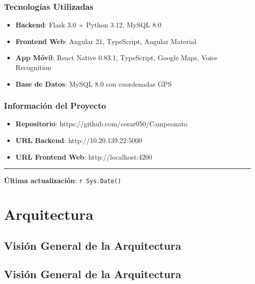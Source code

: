 \documentclass[
  spanish,
  11pt,
  letterpaper,
]{book}
\providecommand{\tightlist}{%
  \setlength{\itemsep}{0pt}\setlength{\parskip}{0pt}}
\begin{document}
\section{Tecnologías Utilizadas}\label{tecnologuxedas-utilizadas}

\begin{itemize}
\tightlist
\item
  \textbf{Backend}: Flask 3.0 + Python 3.12, MySQL 8.0
\item
  \textbf{Frontend Web}: Angular 21, TypeScript, Angular Material
\item
  \textbf{App Móvil}: React Native 0.83.1, TypeScript, Google Maps,
  Voice Recognition
\item
  \textbf{Base de Datos}: MySQL 8.0 con coordenadas GPS
\end{itemize}

\section{Información del Proyecto}\label{informaciuxf3n-del-proyecto}

\begin{itemize}
\tightlist
\item
  \textbf{Repositorio}: https://github.com/cesar050/Campeonato
\item
  \textbf{URL Backend}: http://10.20.139.22:5000
\item
  \textbf{URL Frontend Web}: http://localhost:4200
\end{itemize}

\begin{center}\rule{0.5\linewidth}{0.5pt}\end{center}

\textbf{Última actualización}: \texttt{r\ Sys.Date()}

\part{Arquitectura}

\chapter{Visión General de la
Arquitectura}\label{visiuxf3n-general-de-la-arquitectura}

\chapter{Visión General de la
Arquitectura}\label{visiuxf3n-general-de-la-arquitectura-1}
\end{document}
